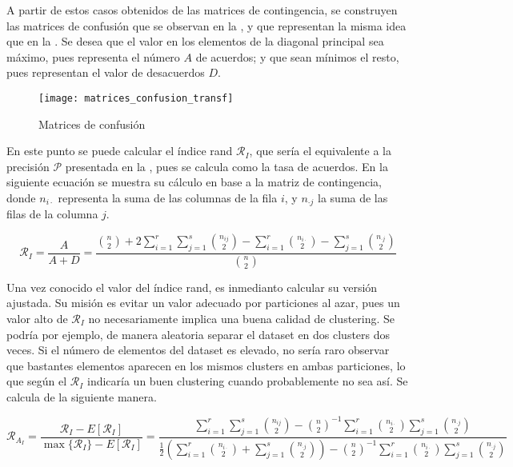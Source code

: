 					A partir de estos casos obtenidos de las matrices de contingencia, se construyen las matrices de confusión que se observan en la , y que representan la misma idea que en la . Se desea que el valor en los elementos de la diagonal principal sea máximo, pues representa el número $A$ de acuerdos; y que sean mínimos el resto, pues representan el valor de desacuerdos $D$. \\
					
					\begin{figure}[!h]
						\centering
						\texttt{[image: matrices\_confusion\_transf]}
						\caption{Matrices de confusión}
						\label{fig:matrices_confusion_transf}
					\end{figure} 
					
					En este punto se puede calcular el índice rand $\mathcal{R}_I$, que sería el equivalente a la precisión $\mathcal{P}$ presentada en la , pues se calcula como la tasa de acuerdos. En la siguiente ecuación se muestra su cálculo en base a la matriz de contingencia, donde $n_{i\cdot}$ representa la suma de las columnas de la fila $i$, y $n_{\cdot j}$ la suma de las filas de la columna $j$. 
					
					$$
					\mathcal{R}_I = \frac{A}{A + D} = \frac{\displaystyle\binom{n}{2} + 2\sum_{i = 1}^r\sum_{j = 1}^s \binom{n_{ij}}{2} - \sum_{i = 1}^r \binom{n_{i\cdot}}{2} - \sum_{j = 1}^s \binom{n_{\cdot j}}{2}}{\displaystyle\binom{n}{2}}
					$$
					
					Una vez conocido el valor del índice rand, es inmedianto calcular su versión ajustada. Su misión es evitar un valor adecuado por particiones al azar, pues un valor alto de $\mathcal{R}_I$ no necesariamente implica una buena calidad de clustering. Se podría por ejemplo, de manera aleatoria separar el dataset en dos clusters dos veces. Si el número de elementos del dataset es elevado, no sería raro observar que bastantes elementos aparecen en los mismos clusters en ambas particiones, lo que según el $\mathcal{R}_I$ indicaría un buen clustering cuando probablemente no sea así. Se calcula de la siguiente manera. 
					
					$$
					\mathcal{R}_{A_I} = \frac{\mathcal{R}_{I} - E[\mathcal{R}_I]}{\max\{\mathcal{R}_I\} - E[\mathcal{R}_I]} = \frac{\displaystyle\sum_{i = 1}^r\sum_{j = 1}^s\binom{n_{ij}}{2} - \binom{n}{2}^{-1}\sum_{i = 1}^r\binom{n_{i\cdot}}{2}\sum_{j = 1}^s\binom{n_{\cdot j}}{2}}{\displaystyle\frac{1}{2}\left(\sum_{i = 1}^r \binom{n_{i\cdot}}{2} + \sum_{j = 1}^s \binom{n_{\cdot j}}{2}\right) - \binom{n}{2}^{-1}\sum_{i = 1}^r\binom{n_{i\cdot}}{2}\sum_{j = 1}^s\binom{n_{\cdot j}}{2}}
					$$
					
